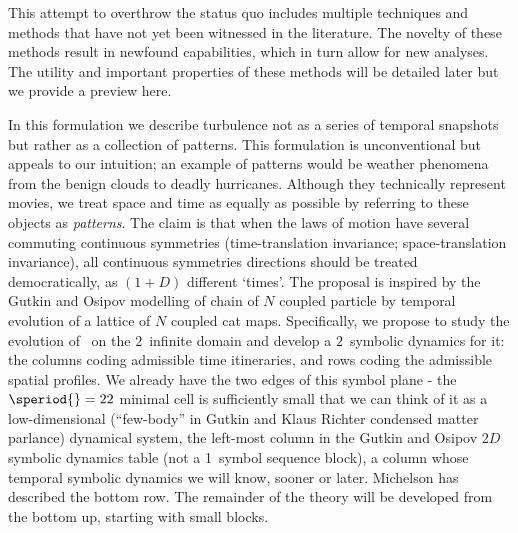 This attempt to overthrow the status quo includes multiple techniques
and methods that have not yet been witnessed in the literature.
The novelty of these methods result in newfound capabilities, which in turn allow for
new analyses. The utility and important properties of these methods
will be detailed later but we provide a preview here.

In this formulation we describe turbulence not as a series of temporal
snapshots but rather as a collection of {\spt} patterns. This formulation
is unconventional but appeals to our intuition; an example of {\spt} patterns
would be weather phenomena from the benign clouds to deadly hurricanes. Although
they technically represent movies, we treat space and time as equally as possible
by referring to these objects as {\spt} \emph{patterns}.
The claim is that when the laws of motion
have several commuting continuous symmetries (time-translation
invariance; space-translation invariance), all continuous symmetries
directions should be treated democratically, as $(1+D)$ different
`times'. The proposal is inspired by the Gutkin and Osipov 
modelling of chain of $N$ coupled particle by temporal evolution of a
lattice of $N$ coupled cat maps.
Specifically, we propose to study the evolution of \KS\ on the $2$\dmn\ infinite
{\spt}domain and develop a $2$\dmn\ symbolic dynamics for it: the
columns coding admissible time itineraries, and rows coding the
admissible spatial profiles.
We already have the two edges of this symbol plane - the $\speriod{}=22$ minimal
cell is sufficiently small that we can think of it as
a low-dimensional (``few-body'' in Gutkin and Klaus
Richter condensed matter parlance)
dynamical system, the left-most column in the Gutkin and
Osipov $2D$ symbolic dynamics {\spt} table (not a
1\dmn\ symbol sequence block), a column whose temporal symbolic dynamics
we will know, sooner or later. Michelson has described the
bottom row. The remainder of the theory will be developed from the
bottom up, starting with small {\spt} blocks.


